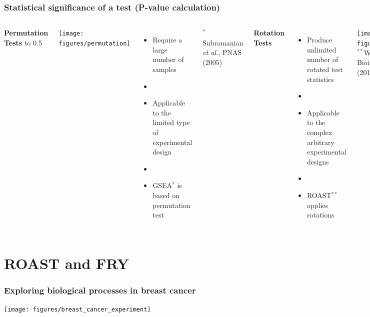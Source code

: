 \documentclass[9pt,t]{beamer}
\begin{document}
\begin{frame}
	\frametitle{Statistical significance of a test \textbf{\color{oxygenrose}(P-value calculation)}}
	\vspace{0.1cm}
	\begin{columns}
	\centering
    \textbf{\color{oxygenpurple} Permutation Tests}
	\vbox to 0.5\textheight
	{
	\vspace{0.02\textwidth}
	\centering
    \texttt{[image: figures/permutation]}                
	\vspace{0.02cm}
	\begin{itemize}
		\item Require a large number of samples 
		\item[]
		\item Applicable to the limited type of experimental design
		\item[]
		\item GSEA$^*$ is based on permutation test
		\end{itemize}
		\vfill
	 \flushleft $^*$\footnotesize Subramanian \emph{et al.},  PNAS (2005)
	 }                       
	\centering
	{\color{oxygenpurple}\textbf{Rotation Tests}}
	\begin{itemize}
	\item Produce unlimited number of rotated test statistics
	\item[]
	\item Applicable to the complex arbitrary experimental designs
	\item[]	
	\item {\ttfamily ROAST}$^{**}$ applies rotations 
	\end{itemize}
	\vspace{0.02cm}
	\texttt{[image: figures/rotation]}
	\vfill
	$^{**}$\footnotesize Wu D. \emph{et al.},  Bioinformatics (2010)
	\end{columns}
\end{frame}

\section{{\ttfamily ROAST} and {\ttfamily FRY}}
\begin{frame}
	\frametitle{Exploring biological processes in breast cancer}
	\centering
	\texttt{[image: figures/breast\_cancer\_experiment]}
\end{frame}
\end{document}
